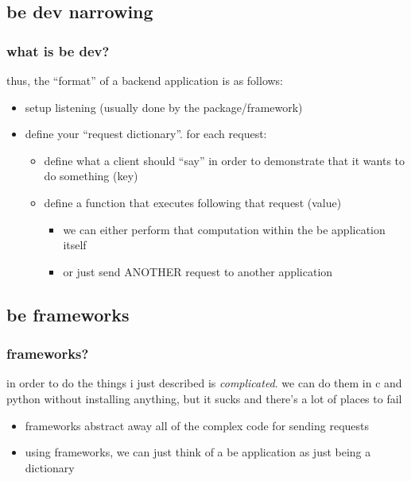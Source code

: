 \documentclass{beamer}
\begin{document}
\subsection{be dev narrowing}
\begin{frame}
\frametitle{what is be dev?}
\begin{block}{\textbf{}}
  thus, the ``format'' of a backend application is
  as follows:
  \begin{itemize}
    \item setup listening (usually done by the package/framework)
    \item define your ``request dictionary''. for each request:
          \begin{itemize}
            \item define what a client should ``say'' in order to
                  demonstrate that it wants to do something (key)
            \item define a function that executes following that request (value)
                  \begin{itemize}
                    \item we can either perform that computation within the
                          be application itself
                    \item or just send ANOTHER request to another application
                  \end{itemize}
          \end{itemize}
  \end{itemize}

\end{block}
\end{frame}





\subsection{be frameworks}
\begin{frame}
\frametitle{frameworks?}
\begin{block}{\textbf{}}
  in order to do the things i just described is
  \textit{complicated}. we can do them in c
  and python without installing anything, but it
  sucks and there's a lot of places to fail
  \begin{itemize}
    \item frameworks abstract away all of the
          complex code for sending requests
    \item using frameworks, we can just think
          of a be application as just being a
          dictionary
  \end{itemize}

\end{block}
\end{frame}
\end{document}
